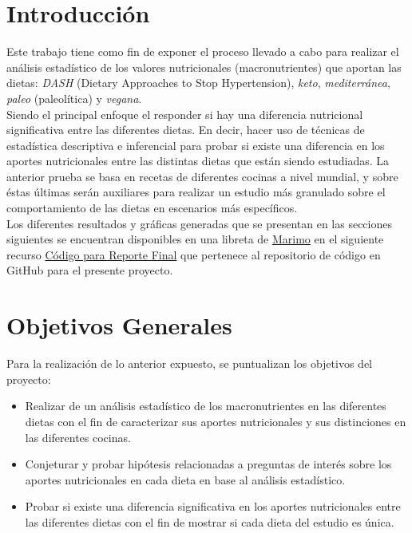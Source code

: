\documentclass[12pt,a4paper]{article}
\begin{document}
    \newpage

    \tableofcontents

    \newpage

    \section{Introducción}
    {
        Este trabajo tiene como fin de exponer el proceso llevado a cabo para 
        realizar el análisis estadístico de los valores nutricionales (macronutrientes) 
        que aportan las dietas: \emph{DASH} (Dietary Approaches to Stop Hypertension), 
        \emph{keto}, \emph{mediterránea}, \emph{paleo} (paleolítica) y \emph{vegana}.\\

        Siendo el principal enfoque el responder si hay una diferencia nutricional 
        significativa entre las diferentes dietas. En decir, hacer uso de 
        técnicas de estadística descriptiva e inferencial para probar si existe 
        una diferencia en los aportes nutricionales entre las distintas dietas que 
        están siendo estudiadas. La anterior prueba se basa en recetas de diferentes 
        cocinas a nivel mundial, y sobre éstas últimas serán auxiliares para realizar 
        un estudio más granulado sobre el comportamiento de las dietas en escenarios 
        más específicos.\\

        Los diferentes resultados y gráficas generadas que se presentan en las secciones 
        siguientes se encuentran disponibles en una libreta de \href{https://github.com/marimo-team/marimo}{Marimo} 
        en el siguiente recurso \href{https://github.com/alexisuaguilaru/Analysis_Nutritional_Information/blob/main/Documentation/AlexisAguilar_ReporteFinal.py}{Código para Reporte Final} 
        que pertenece al repositorio de código en GitHub para el presente proyecto.
    }

    \section{Objetivos Generales}
    {
        Para la realización de lo anterior expuesto, se puntualizan los objetivos del 
        proyecto:
        \begin{itemize}
            \item Realizar de un análisis estadístico de los macronutrientes en las 
            diferentes dietas con el fin de caracterizar sus aportes nutricionales y 
            sus distinciones en las diferentes cocinas.
            
            \item Conjeturar y probar hipótesis relacionadas a preguntas de interés 
            sobre los aportes nutricionales en cada dieta en base al análisis estadístico. 
            
            \item Probar si existe una diferencia significativa en los aportes 
            nutricionales entre las diferentes dietas con el fin de mostrar si cada 
            dieta del estudio es única.
        \end{itemize}
    }
\end{document}
